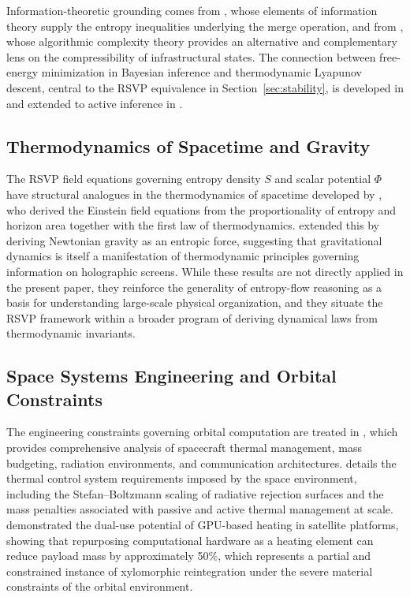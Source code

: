 \documentclass[11pt,a4paper]{article}
\theoremstyle{plain}
\theoremstyle{definition}
\theoremstyle{remark}
\begin{document}
Information-theoretic grounding comes from \citet{cover2006}, whose elements
of information theory supply the entropy inequalities underlying the merge
operation, and from \citet{kolmogorov1965}, whose algorithmic complexity theory
provides an alternative and complementary lens on the compressibility of
infrastructural states. The connection between free-energy minimization in
Bayesian inference and thermodynamic Lyapunov descent, central to the RSVP
equivalence in Section~\ref{sec:stability}, is developed in \citet{friston2010}
and extended to active inference in \citet{parr2022}.

\subsection{Thermodynamics of Spacetime and Gravity}

The RSVP field equations governing entropy density $S$ and scalar potential
$\Phi$ have structural analogues in the thermodynamics of spacetime developed
by \citet{jacobson1995}, who derived the Einstein field equations from the
proportionality of entropy and horizon area together with the first law of
thermodynamics. \citet{verlinde2011} extended this by deriving Newtonian gravity
as an entropic force, suggesting that gravitational dynamics is itself a
manifestation of thermodynamic principles governing information on holographic
screens. While these results are not directly applied in the present paper, they
reinforce the generality of entropy-flow reasoning as a basis for understanding
large-scale physical organization, and they situate the RSVP framework within a
broader program of deriving dynamical laws from thermodynamic invariants.

\subsection{Space Systems Engineering and Orbital Constraints}

The engineering constraints governing orbital computation are treated in
\citet{wertz2011}, which provides comprehensive analysis of spacecraft thermal
management, mass budgeting, radiation environments, and communication
architectures. \citet{nasa2016} details the thermal control system requirements
imposed by the space environment, including the Stefan--Boltzmann scaling of
radiative rejection surfaces and the mass penalties associated with passive and
active thermal management at scale. \citet{yuan2024} demonstrated the dual-use
potential of GPU-based heating in satellite platforms, showing that repurposing
computational hardware as a heating element can reduce payload mass by
approximately 50\%, which represents a partial and constrained instance of
xylomorphic reintegration under the severe material constraints of the orbital
environment.
\end{document}
